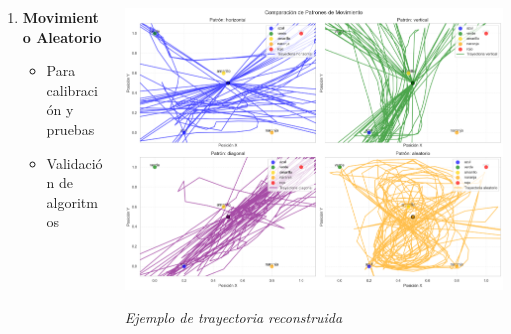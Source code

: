 \documentclass[xcolor=dvipsnames]{beamer}
\begin{document}
\begin{frame}
\begin{columns}
\begin{column}{0.5\textwidth}
\begin{enumerate}
                \item \textcolor{UniOrange}{\textbf{Movimiento Aleatorio}}
                \begin{itemize}
                    \item Para calibración y pruebas
                    \item Validación de algoritmos
                \end{itemize}
            \end{enumerate}
        \end{column}
        \begin{column}{0.5\textwidth}
            \begin{center}
                \includegraphics[width=\textwidth]{../assets/result.png}
                
                \vspace{0.3cm}
                \textit{Ejemplo de trayectoria reconstruida}
            \end{center}
        \end{column}
    \end{columns}
\end{frame}
\end{document}
